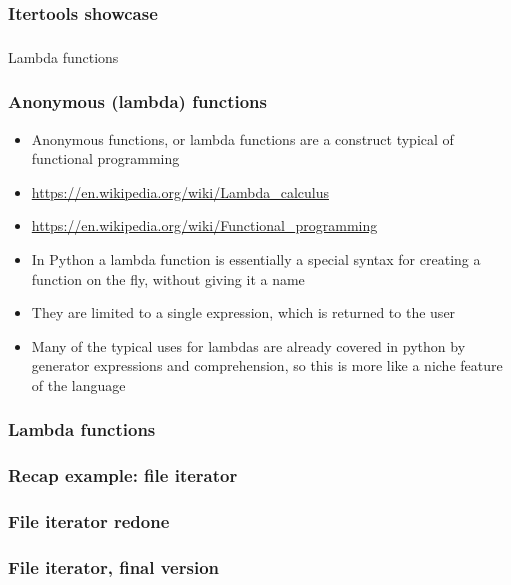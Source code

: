 \documentclass[9pt]{beamer}
\begin{document}
\begin{frame}
  \frametitle{Itertools showcase}
  
\end{frame}


\begin{frame}
  \frametitle{}
  \centering \Large Lambda functions
\end{frame}


\begin{frame}
  \frametitle{Anonymous (lambda) functions}
  \begin{itemize}
    \item \alert{Anonymous functions}, or \alert{lambda functions} are a construct typical of \alert{functional programming}
    \item \url{https://en.wikipedia.org/wiki/Lambda_calculus}
    \item \url{https://en.wikipedia.org/wiki/Functional_programming}
    \item In Python a lambda function is essentially a special syntax for creating a function
          on the fly, without giving it a name
    \item They are limited to \alert{a single expression}, which is returned to the user
    \item Many of the typical uses for lambdas are already covered in python by generator expressions and comprehension,
          so this is more like a niche feature of the language
  \end{itemize}

\end{frame}


\begin{frame}
  \frametitle{Lambda functions}
  
\end{frame}


\begin{frame}
  \frametitle{Recap example: file iterator}
  
\end{frame}


\begin{frame}
  \frametitle{File iterator redone}
  
\end{frame}


\begin{frame}
  \frametitle{File iterator, final version}
  
\end{frame}
\end{document}
